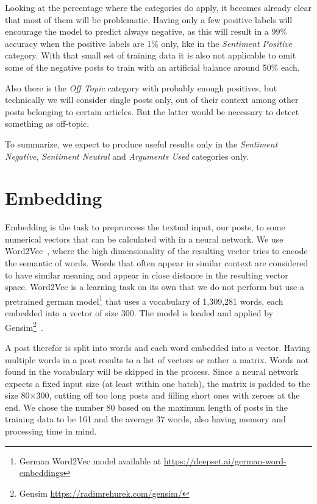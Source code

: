 \documentclass[11pt,a4paper]{article}
\begin{document}
Looking at the percentage where the categories do apply, it becomes already clear that most of them will be problematic. 
Having only a few positive labels will encourage the model to predict always negative, as this will result in a 99\% accuracy when the positive labels are 1\% only, like in the \textit{Sentiment Positive} category. With that small set of training data it is also not applicable to omit some of the negative posts to train with an artificial balance around 50\% each.

Also there is the \textit{Off Topic} category with probably enough positives, but technically we will consider single posts only, out of their context among other posts belonging to certain articles. But the latter would be necessary to detect something as off-topic.

To summarize, we expect to produce useful results only in the \textit{Sentiment Negative}, \textit{Sentiment Neutral} and \textit{Arguments Used} categories only.

\section{Embedding}

Embedding is the task to preproccess the textual input, our posts, to some numerical vectors that can be calculated with in a neural network. 
We use Word2Vec~\cite{word2vec}, where the high dimensionality of the resulting vector tries to encode the semantic of words. 
Words that often appear in similar context are considered to have similar meaning and appear in close distance in the resulting vector space.
Word2Vec is a learning task on its own that we do not perform but use a pretrained german model\footnote{German Word2Vec model available at \url{https://deepset.ai/german-word-embeddings}} that uses a vocabulary of 1,309,281 words, each embedded into a vector of size 300.
The model is loaded and applied by Gensim\footnote{Gensim \url{https://radimrehurek.com/gensim/}}~\cite{gensim}.

A post therefor is split into words and each word embedded into a vector. Having multiple words in a post results to a list of vectors or rather a matrix. 
Words not found in the vocabulary will be skipped in the process. 
Since a neural network expects a fixed input size (at least within one batch), the matrix is padded to the size 80$\times$300, cutting off too long posts and filling short ones with zeroes at the end. 
We chose the number 80 based on the maximum length of posts in the training data to be 161 and the average 37 words, also having memory and processing time in mind.
\end{document}
